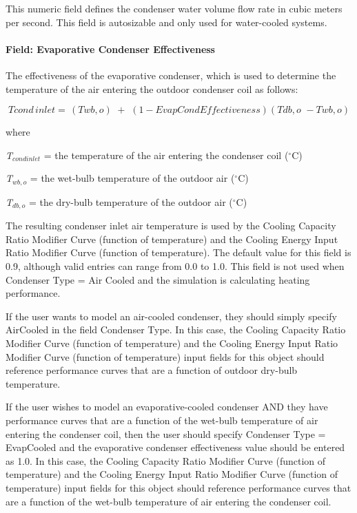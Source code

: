 This numeric field defines the condenser water volume flow rate in cubic meters per second. This field is autosizable and only used for water-cooled systems.

\paragraph{Field: Evaporative Condenser Effectiveness}\label{field-evaporative-condenser-effectiveness-002}

The effectiveness of the evaporative condenser, which is used to determine the temperature of the air entering the outdoor condenser coil as follows:

\begin{equation}
Tcond\,inlet = \,\left( {Twb,o} \right)\,\, + \,\,\left( {1 - EvapCondEffectiveness} \right)\left( {Tdb,o\,\, - Twb,o} \right)
\end{equation}

where

\emph{T\(_{cond inlet}\)} = the temperature of the air entering the condenser coil ($^\circ$C)

\emph{T\(_{wb,o}\)} = the wet-bulb temperature of the outdoor air ($^\circ$C)

\emph{T\(_{db,o}\)} = the dry-bulb temperature of the outdoor air ($^\circ$C)

The resulting condenser inlet air temperature is used by the Cooling Capacity Ratio Modifier Curve (function of temperature) and the Cooling Energy Input Ratio Modifier Curve (function of temperature). The default value for this field is 0.9, although valid entries can range from 0.0 to 1.0. This field is not used when Condenser Type = Air Cooled and the simulation is calculating heating performance.

If the user wants to model an air-cooled condenser, they should simply specify AirCooled in the field Condenser Type. In this case, the Cooling Capacity Ratio Modifier Curve (function of temperature) and the Cooling Energy Input Ratio Modifier Curve (function of temperature) input fields for this object should reference performance curves that are a function of outdoor dry-bulb temperature.

If the user wishes to model an evaporative-cooled condenser AND they have performance curves that are a function of the wet-bulb temperature of air entering the condenser coil, then the user should specify Condenser Type = EvapCooled and the evaporative condenser effectiveness value should be entered as 1.0. In this case, the Cooling Capacity Ratio Modifier Curve (function of temperature) and the Cooling Energy Input Ratio Modifier Curve (function of temperature) input fields for this object should reference performance curves that are a function of the wet-bulb temperature of air entering the condenser coil.

